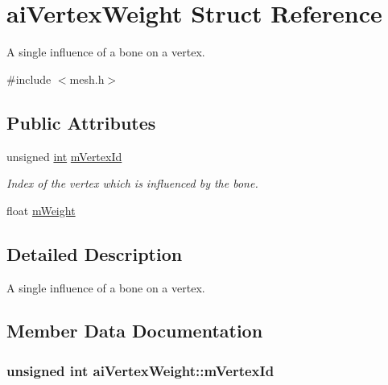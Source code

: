\hypertarget{structai_vertex_weight}{\section{ai\-Vertex\-Weight Struct Reference}
\label{structai_vertex_weight}
}


A single influence of a bone on a vertex.  




{\ttfamily \#include $<$mesh.\-h$>$}

\subsection*{Public Attributes}
\begin{DoxyCompactItemize}
\item 
unsigned \hyperlink{_s_d_l__thread_8h_a6a64f9be4433e4de6e2f2f548cf3c08e}{int} \hyperlink{structai_vertex_weight_af6269cf6a0f02e5ae870a72046d58f4f}{m\-Vertex\-Id}
\begin{DoxyCompactList}\small\item\em Index of the vertex which is influenced by the bone. \end{DoxyCompactList}\item 
float \hyperlink{structai_vertex_weight_abab9c49baabc2cafef9ac840f59e61b8}{m\-Weight}
\end{DoxyCompactItemize}


\subsection{Detailed Description}
A single influence of a bone on a vertex. 

\subsection{Member Data Documentation}
\hypertarget{structai_vertex_weight_af6269cf6a0f02e5ae870a72046d58f4f}{
\subsubsection[{m\-Vertex\-Id}]{\setlength{\rightskip}{0pt plus 5cm}unsigned {\bf int} ai\-Vertex\-Weight\-::m\-Vertex\-Id}}\label{structai_vertex_weight_af6269cf6a0f02e5ae870a72046d58f4f}


